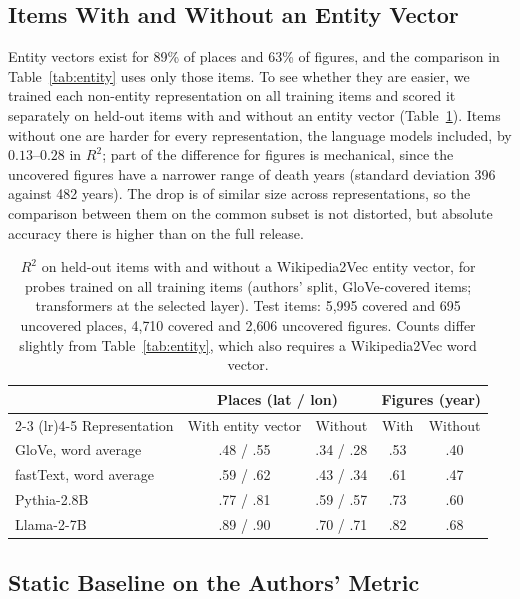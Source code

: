 \documentclass[11pt]{article}
\begin{document}
\subsection{Items With and Without an Entity Vector}
\label{sec:coverage}

Entity vectors exist for 89\% of places and 63\% of figures, and the comparison in Table~\ref{tab:entity} uses only those items. To see whether they are easier, we trained each non-entity representation on all training items and scored it separately on held-out items with and without an entity vector (Table~\ref{tab:coverage}). Items without one are harder for every representation, the language models included, by $0.13$--$0.28$ in $R^2$; part of the difference for figures is mechanical, since the uncovered figures have a narrower range of death years (standard deviation 396 against 482 years). The drop is of similar size across representations, so the comparison between them on the common subset is not distorted, but absolute accuracy there is higher than on the full release.

\begin{table}[t]
  \centering
  \caption{$R^2$ on held-out items with and without a Wikipedia2Vec entity vector, for probes trained on all training items (authors' split, GloVe-covered items; transformers at the selected layer). Test items: 5{,}995 covered and 695 uncovered places, 4{,}710 covered and 2{,}606 uncovered figures. Counts differ slightly from Table~\ref{tab:entity}, which also requires a Wikipedia2Vec word vector.}
  \label{tab:coverage}
  \small
  \begin{tabular}{lcccc}
    \toprule
    & \multicolumn{2}{c}{Places (lat / lon)} & \multicolumn{2}{c}{Figures (year)} \\
    \cmidrule(lr){2-3} \cmidrule(lr){4-5}
    Representation & With entity vector & Without & With & Without \\
    \midrule
    GloVe, word average    & .48 / .55 & .34 / .28 & .53 & .40 \\
    fastText, word average & .59 / .62 & .43 / .34 & .61 & .47 \\
    Pythia-2.8B            & .77 / .81 & .59 / .57 & .73 & .60 \\
    Llama-2-7B             & .89 / .90 & .70 / .71 & .82 & .68 \\
    \bottomrule
  \end{tabular}
\end{table}

\subsection{Static Baseline on the Authors' Metric}
\end{document}
